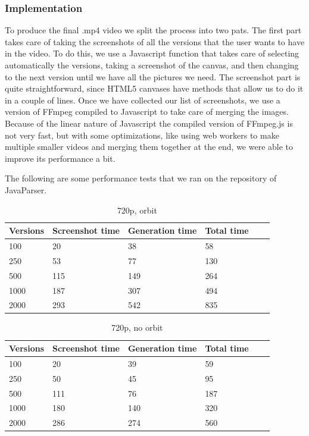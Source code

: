 \documentclass[]{usiinfbachelorproject}
\begin{document}
\subsubsection{Implementation} \label{Implementation}

To produce the final .mp4 video we split the process into two pats.
The first part takes care of taking the screenshots of all the versions that the user wants to have in the video. To do this, we use a Javascript function that takes care of selecting automatically the versions, taking a screenshot of the canvas, and then changing to the next version until we have all the pictures we need. The screenshot part is quite straightforward, since HTML5 canvases have methods that allow us to do it in a couple of lines.
Once we have collected our list of screenshots, we use a version of FFmpeg compiled to Javascript to take care of merging the images. Because of the linear nature of Javascript the compiled version of FFmpeg.js is not very fast, but with some optimizations, like using web workers to make multiple smaller videos and merging them together at the end, we were able to improve its performance a bit.

The following are some performance tests that we ran on the repository of JavaParser.

\begin{table}[H]
    \begin{center}
        \begin{tabular}{ | l | l | l | l | l | l |}
        \hline
        Versions & Screenshot time & Generation time & Total time \\ \hline
        100 & 20 & 38 & 58 \\ \hline
        250 & 53 & 77 & 130\\ \hline
        500 & 115 & 149 & 264\\ \hline
        1000 & 187 & 307 & 494 \\ \hline
        2000 & 293 & 542 & 835 \\ \hline
        \end{tabular}
    \end{center}
    \caption{720p, orbit}
    \label{tab:performance}
\end{table}

\begin{table}[H]
    \begin{center}
        \begin{tabular}{ | l | l | l | l | l | l |}
        \hline
        Versions & Screenshot time & Generation time & Total time \\ \hline
        100 & 20 & 39 & 59 \\ \hline
        250 & 50 & 45 & 95\\ \hline
        500 & 111 & 76 & 187\\ \hline
        1000 & 180 & 140 & 320 \\ \hline
        2000 & 286 & 274 & 560 \\ \hline
        \end{tabular}
    \end{center}
    \caption{720p, no orbit}
    \label{tab:performance}
\end{table}
\end{document}

